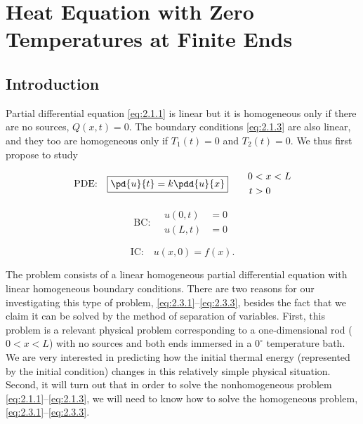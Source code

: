 \section{Heat Equation with Zero Temperatures at Finite Ends}
\label{sec:2.3}

\subsection{Introduction}
\label{sec:2.3.1}

Partial differential equation \eqref{eq:2.1.1} is linear but it is homogeneous only if there are no sources, $Q(x,t) = 0$. The boundary conditions \eqref{eq:2.1.3} are also linear, and they too are homogeneous only if $T_1(t) = 0$ and $T_2(t) = 0$. We thus first propose to study

\begin{equation}
\label{eq:2.3.1}
\text{PDE:}\quad
\boxed{\pd{u}{t} = k\pdd{u}{x}} \qquad
\begin{aligned}
0 &< x < L \\
t &> 0
\end{aligned}
\end{equation}

\begin{equation}
\label{eq:2.3.2}
\text{BC:}\quad
\boxed{\begin{aligned}
u(0,t) &= 0 \\
u(L,t) &= 0
\end{aligned}}
\end{equation}

\begin{equation}
\label{eq:2.3.3}
\text{IC:}\quad
\boxed{u(x,0) = f(x).}
\end{equation}

The problem consists of a linear homogeneous partial differential equation with linear homogeneous boundary conditions. There are two reasons for our investigating this type of problem, \eqref{eq:2.3.1}--\eqref{eq:2.3.3}, besides the fact that we claim it can be solved by the method of separation of variables. First, this problem is a relevant physical problem corresponding to a one-dimensional rod ($0 < x < L$) with no sources and both ends immersed in a $0^\circ$ temperature bath. We are very interested in predicting how the initial thermal energy (represented by the initial condition) changes in this relatively simple physical situation. Second, it will turn out that in order to solve the nonhomogeneous problem \eqref{eq:2.1.1}--\eqref{eq:2.1.3}, we will need to know how to solve the homogeneous problem, \eqref{eq:2.3.1}--\eqref{eq:2.3.3}.

